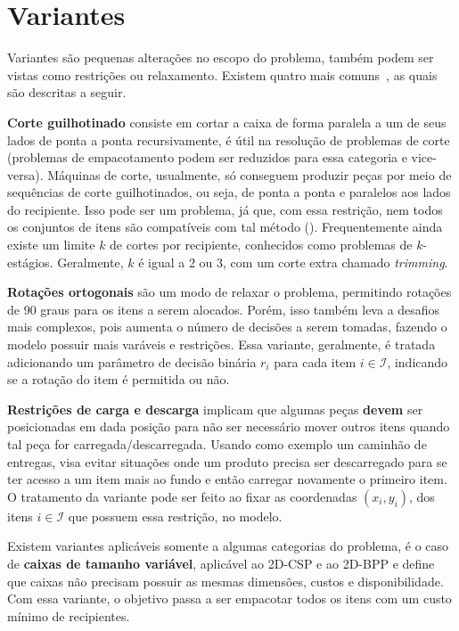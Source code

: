 \section{Variantes}\label{sec:variantes}


Variantes são pequenas alterações no escopo do problema, também podem ser vistas como restrições
ou relaxamento.
Existem quatro mais comuns~\cite{2DPackLib,exact-solution-techniques}, as quais são descritas a seguir.

\textbf{Corte guilhotinado} consiste em cortar a caixa de forma paralela a um de seus lados de ponta
a ponta recursivamente, é útil na resolução de problemas de corte (problemas de empacotamento
podem ser reduzidos para essa categoria e vice-versa).
Máquinas de corte, usualmente, só conseguem produzir peças por meio de sequências de corte
guilhotinados, ou seja, de ponta a ponta e paralelos aos lados do recipiente.
Isso pode ser um problema, já que, com essa restrição, nem todos os conjuntos de itens são
compatíveis com tal método ().
Frequentemente ainda existe um limite $k$ de cortes por recipiente, conhecidos como problemas de
$k$-estágios.
Geralmente, $k$ é igual a 2 ou 3, com um corte extra chamado \textit{trimming}.



\textbf{Rotações ortogonais} são um modo de relaxar o problema, permitindo rotações de 90 graus
para os itens a serem alocados.
Porém, isso também leva a desafios mais complexos, pois aumenta o número de decisões a serem tomadas,
fazendo o modelo possuir mais varáveis e restrições.
Essa variante, geralmente, é tratada adicionando um parâmetro de decisão binária $r_i$ para cada
item $i \in \mathcal{I}$, indicando se a rotação do item é permitida ou não.

\textbf{Restrições de carga e descarga} implicam que algumas peças \textbf{devem} ser posicionadas
em dada posição para não ser necessário mover outros itens quando tal peça for carregada/descarregada.
Usando como exemplo um caminhão de entregas, visa evitar situações onde um produto
precisa ser descarregado para se ter acesso a um item mais ao fundo e então carregar novamente o
primeiro item.
O tratamento da variante pode ser feito ao fixar as coordenadas $(x_i, y_i)$, dos itens
$i \in \mathcal{I}$ que possuem essa restrição, no modelo.

Existem variantes aplicáveis somente a algumas categorias do problema, é o caso de \textbf{caixas
de tamanho variável}, aplicável ao 2D-CSP e ao 2D-BPP e define que caixas
não precisam possuir as mesmas dimensões, custos e disponibilidade.
Com essa variante, o objetivo passa a ser empacotar todos os itens com um custo mínimo de recipientes.
